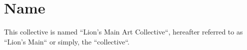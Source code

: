 \chapter{Name}\label{sec:name}
This collective is named ``Lion's Main Art Collective``, hereafter referred to as ``Lion's Main`` or simply, the ``collective``.
